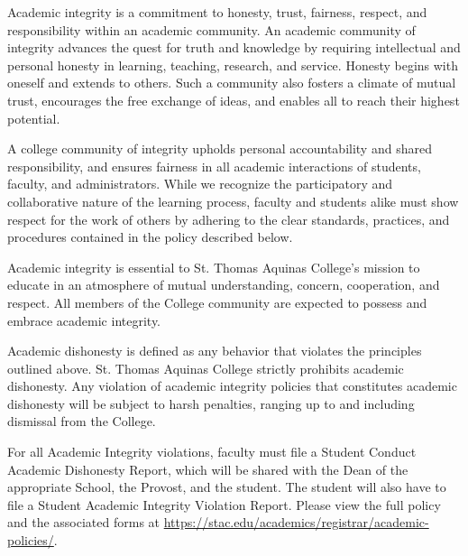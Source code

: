 \documentclass[11pt,letterpaper]{article}
\begin{document}
Academic integrity is a commitment to honesty, trust, fairness, respect, and responsibility within an academic community. An academic community of integrity advances the quest for truth and knowledge by requiring intellectual and personal honesty in learning, teaching, research, and service. Honesty begins with oneself and extends to others. Such a community also fosters a climate of mutual trust, encourages the free exchange of ideas, and enables all to reach their highest potential. \pspace

A college community of integrity upholds personal accountability and shared responsibility, and ensures fairness in all academic interactions of students, faculty, and administrators. While we recognize the participatory and collaborative nature of the learning process, faculty and students alike must show respect for the work of others by adhering to the clear standards, practices, and procedures contained in the policy described below. \pspace

Academic integrity is essential to St. Thomas Aquinas College’s mission to educate in an atmosphere of mutual understanding, concern, cooperation, and respect. All members of the College community are expected to possess and embrace academic integrity. \sectionbreak




Academic dishonesty is defined as any behavior that violates the principles outlined above. St. Thomas Aquinas College strictly prohibits academic dishonesty. Any violation of academic integrity policies that constitutes academic dishonesty will be subject to harsh penalties, ranging up to and including dismissal from the College. \pspace

For all Academic Integrity violations, faculty must file a Student Conduct Academic Dishonesty Report, which will be shared with the Dean of the appropriate School, the Provost, and the student. The student will also have to file a Student Academic Integrity Violation Report. Please view the full policy and the associated forms at \url{https://stac.edu/academics/registrar/academic-policies/}. \sectionbreak





\newpage





\end{document}
